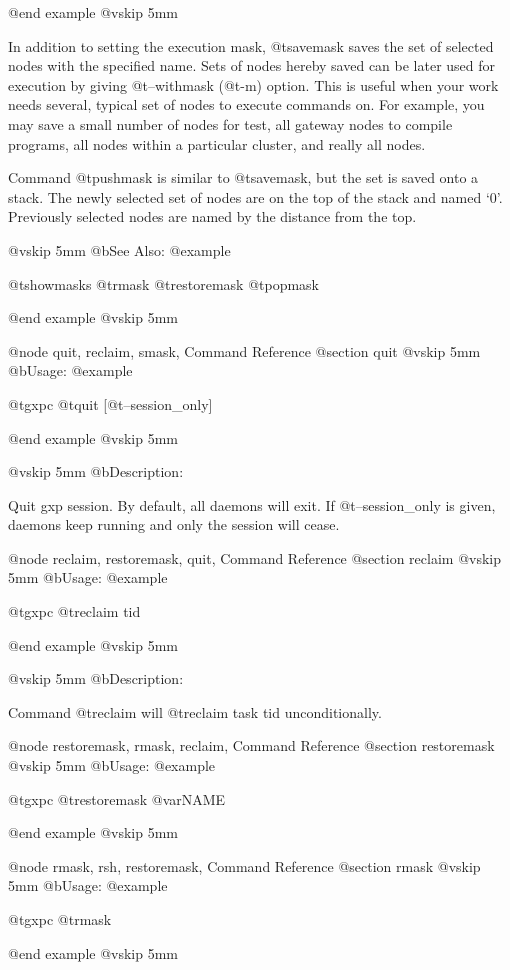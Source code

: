 @end example
@vskip 5mm

In addition to setting the execution mask, @t{savemask} saves the set
of selected nodes with the specified name. Sets of nodes hereby
saved can be later used for execution by giving @t{--withmask} (@t{-m})
option. This is useful when your work needs several, typical set
of nodes to execute commands on. For example, you may save a
small number of nodes for test, all gateway nodes to compile
programs, all nodes within a particular cluster, and really all
nodes.

Command @t{pushmask} is similar to @t{savemask}, but the set is saved
onto a stack. The newly selected set of nodes are on the top of
the stack and named `0'.  Previously selected nodes are named by
the distance from the top.

@vskip 5mm
@b{See Also:}
@example

  @t{showmasks} @t{rmask} @t{restoremask} @t{popmask}

@end example
@vskip 5mm

@node quit, reclaim, smask, Command Reference
@section quit
@vskip 5mm
@b{Usage:}
@example

  @t{gxpc} @t{quit} [@t{--session_only}]

@end example
@vskip 5mm

@vskip 5mm
@b{Description:}


  Quit gxp session. By default, all daemons will exit.
If @t{--session_only} is given, daemons keep running and only the 
session will cease.

@node reclaim, restoremask, quit, Command Reference
@section reclaim
@vskip 5mm
@b{Usage:}
@example

  @t{gxpc} @t{reclaim} tid

@end example
@vskip 5mm

@vskip 5mm
@b{Description:}


  Command @t{reclaim} will @t{reclaim} task tid unconditionally.

@node restoremask, rmask, reclaim, Command Reference
@section restoremask
@vskip 5mm
@b{Usage:}
@example

  @t{gxpc} @t{restoremask} @var{NAME}

@end example
@vskip 5mm

@node rmask, rsh, restoremask, Command Reference
@section rmask
@vskip 5mm
@b{Usage:}
@example

  @t{gxpc} @t{rmask}

@end example
@vskip 5mm


